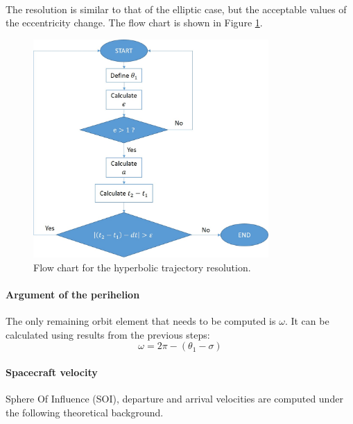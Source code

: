 \begin{itemize}
\begin{multline}
\end{multline}
The resolution is similar to that of the elliptic case, but the acceptable values of the eccentricity change. The flow chart is shown in Figure \ref{Flowhyp}.
\begin{figure}[H]
\centering
\includegraphics[width=0.8\textwidth]{././images/flowcharthyp.jpg} 
\caption{Flow chart for the hyperbolic trajectory resolution.}
\label{Flowhyp}
\end{figure}
\end{itemize}
\paragraph{Argument of the perihelion} 
The only remaining orbit element that needs to be computed is $\omega$. It can be calculated using results from the previous steps:
\begin{equation}
\omega = 2\pi - (\theta _1 - \sigma )
\end{equation}

\paragraph{Spacecraft velocity}
Sphere Of Influence (SOI), departure and arrival velocities are computed under the following theoretical background.

